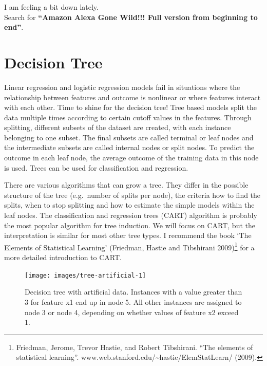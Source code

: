 \documentclass[
  12pt,
]{krantz}
\begin{document}
I am feeling a bit down lately.\\
Search for \textbf{``Amazon Alexa Gone Wild!!! Full version from beginning to end''}.

\newpage

\hypertarget{tree}{%
\section{Decision Tree}\label{tree}}

Linear regression and logistic regression models fail in situations where the relationship between features and outcome is nonlinear or where features interact with each other.
Time to shine for the decision tree!
Tree based models split the data multiple times according to certain cutoff values in the features.
Through splitting, different subsets of the dataset are created, with each instance belonging to one subset.
The final subsets are called terminal or leaf nodes and the intermediate subsets are called internal nodes or split nodes.
To predict the outcome in each leaf node, the average outcome of the training data in this node is used.
Trees can be used for classification and regression.

There are various algorithms that can grow a tree.
They differ in the possible structure of the tree (e.g.~number of splits per node), the criteria how to find the splits, when to stop splitting and how to estimate the simple models within the leaf nodes.
The classification and regression trees (CART) algorithm is probably the most popular algorithm for tree induction.
We will focus on CART, but the interpretation is similar for most other tree types.
I recommend the book `The Elements of Statistical Learning' (Friedman, Hastie and Tibshirani 2009)\footnote{Friedman, Jerome, Trevor Hastie, and Robert Tibshirani. ``The elements of statistical learning''. www.web.stanford.edu/\textasciitilde hastie/ElemStatLearn/ (2009).} for a more detailed introduction to CART.

\begin{figure}

{\centering \texttt{[image: images/tree-artificial-1]} 

}

\caption{Decision tree with artificial data. Instances with a value greater than 3 for feature x1 end up in node 5. All other instances are assigned to node 3 or node 4, depending on whether values of feature x2  exceed 1.}\label{fig:tree-artificial}
\end{figure}
\end{document}
